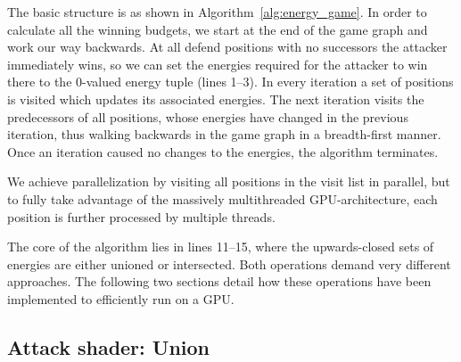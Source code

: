The basic structure is as shown in Algorithm~\ref{alg:energy_game}.
In order to calculate all the winning budgets,
we start at the end of the game graph and work our way backwards.
At all defend positions with no successors the attacker immediately wins,
so we can set the energies required for the attacker to win there to the
0-valued energy tuple (lines 1--3).
In every iteration a set of positions is visited which updates its associated
energies.
The next iteration visits the predecessors of all positions, whose energies
have changed in the previous iteration, thus walking backwards in the game
graph in a breadth-first manner. Once an iteration caused no changes to the
energies, the algorithm terminates.

We achieve parallelization by visiting all positions in the visit list in
parallel, but to fully take advantage of the massively multithreaded
GPU-architecture, each position is further processed by multiple threads.

The core of the algorithm lies in lines 11--15, where the upwards-closed sets of
energies are either unioned or intersected.
Both operations demand very different approaches.
The following two sections detail how these operations have been implemented to
efficiently run on a GPU\@.


\subsection{Attack shader: Union}

